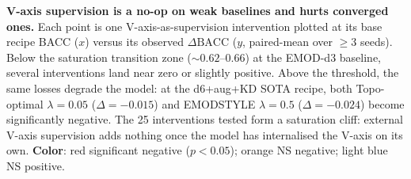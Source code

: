 \textbf{V-axis supervision is a no-op on weak baselines and hurts converged ones.}
Each point is one V-axis-as-supervision intervention plotted at its base recipe BACC ($x$) versus its observed $\Delta\mathrm{BACC}$ ($y$, paired-mean over $\geq 3$ seeds).
Below the saturation transition zone ($\sim\!0.62$--$0.66$) at the EMOD-d3 baseline, several interventions land near zero or slightly positive.
Above the threshold, the same losses degrade the model: at the d6+aug+KD SOTA recipe, both Topo-optimal $\lambda{=}0.05$ ($\Delta{=}{-}0.015$) and EMODSTYLE $\lambda{=}0.5$ ($\Delta{=}{-}0.024$) become significantly negative.
The 25 interventions tested form a saturation cliff: external V-axis supervision adds nothing once the model has internalised the V-axis on its own.
\textbf{Color}: \textcolor[HTML]{d62728}{red} significant negative ($p{<}0.05$); \textcolor[HTML]{ff7f0e}{orange} NS negative; \textcolor[HTML]{9ecae1}{light blue} NS positive.
